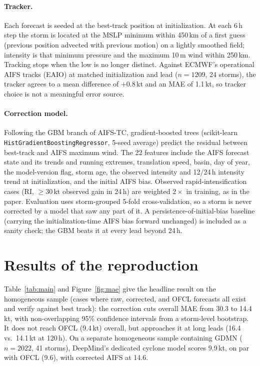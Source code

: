 \documentclass[11pt]{article}
\begin{document}
\paragraph{Tracker.} Each forecast is seeded at the best-track position at initialization. At each
6\,h step the storm is located at the MSLP minimum within 450\,km of a first guess (previous
position advected with previous motion) on a lightly smoothed field; intensity is that minimum
pressure and the maximum 10\,m wind within 250\,km. Tracking stops when the low is no longer
distinct. Against ECMWF's operational AIFS tracks (EAIO) at matched initialization and lead
($n=1209$, 24 storms), the tracker agrees to a mean difference of $+0.8$\,kt and an MAE of
1.1\,kt, so tracker choice is not a meaningful error source.

\paragraph{Correction model.} Following the GBM branch of AIFS-TC, gradient-boosted trees
(scikit-learn \texttt{HistGradientBoostingRegressor}, 5-seed average) predict the residual between
best-track and AIFS maximum wind. The 22 features include the AIFS forecast state and its trends
and running extremes, translation speed, basin, day of year, the model-version flag, storm age,
the observed intensity and 12/24\,h intensity trend at initialization, and the initial AIFS bias.
Observed rapid-intensification cases (RI, $\ge 30$\,kt observed gain in 24\,h) are weighted
$2\times$ in training, as in the paper. Evaluation uses storm-grouped 5-fold cross-validation, so
a storm is never corrected by a model that saw any part of it. A persistence-of-initial-bias
baseline (carrying the initialization-time AIFS bias forward unchanged) is included as a sanity
check; the GBM beats it at every lead beyond 24\,h.

\section{Results of the reproduction}\label{sec:results}

Table~\ref{tab:main} and Figure~\ref{fig:mae} give the headline result on the homogeneous sample
(cases where raw, corrected, and OFCL forecasts all exist and verify against best track):
the correction cuts overall MAE from 30.3 to 14.4\,kt, with non-overlapping 95\% confidence
intervals from a storm-level bootstrap. It does not reach OFCL (9.4\,kt) overall, but approaches
it at long leads (16.4 vs.\ 14.1\,kt at 120\,h). On a separate homogeneous sample containing
GDMN ($n=2022$, 41 storms), DeepMind's dedicated cyclone model scores 9.9\,kt, on par with OFCL
(9.6), with corrected AIFS at 14.6.
\end{document}
